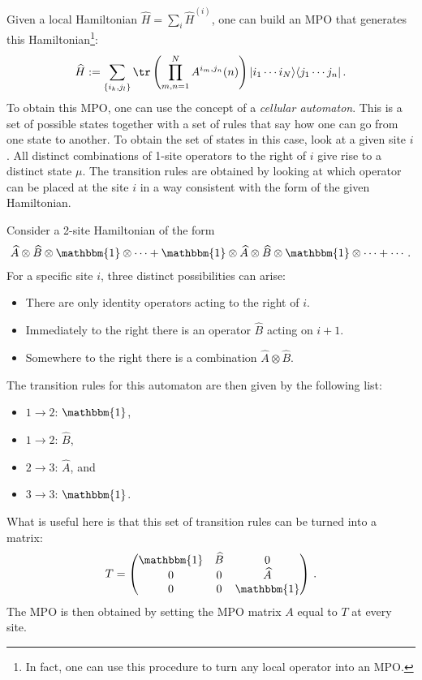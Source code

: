     \begin{method}
        Given a local Hamiltonian $\widehat{H}=\sum_i\widehat{H}^{(i)}$, one can build an MPO that generates this Hamiltonian\footnote{In fact, one can use this procedure to turn any local operator into an MPO.}:
        \begin{gather}
            \widehat{H} := \sum_{\{i_k,j_l\}}\tr\left(\prod_{m,n=1}^NA^{i_m,j_n}(n)\right)|i_1\cdots i_N\rangle\langle j_1\cdots j_n|\,.
        \end{gather}
        To obtain this MPO, one can use the concept of a \textit{cellular automaton}. This is a set of possible states together with a set of rules that say how one can go from one state to another. To obtain the set of states in this case, look at a given site $i$. All distinct combinations of 1-site operators to the right of $i$ give rise to a distinct state $\mu$. The transition rules are obtained by looking at which operator can be placed at the site $i$ in a way consistent with the form of the given Hamiltonian.
    \end{method}
    \begin{example}
        Consider a 2-site Hamiltonian of the form
        \begin{gather}
            \widehat{A}\otimes\widehat{B}\otimes\mathbbm{1}\otimes\cdots+\mathbbm{1}\otimes\widehat{A}\otimes\widehat{B}\otimes\mathbbm{1}\otimes\cdots+\cdots\,.
        \end{gather}
        For a specific site $i$, three distinct possibilities can arise:
        \begin{itemize}
            \item There are only identity operators acting to the right of $i$.
            \item Immediately to the right there is an operator $\widehat{B}$ acting on $i+1$.
            \item Somewhere to the right there is a combination $\widehat{A}\otimes\widehat{B}$.
        \end{itemize}
        The transition rules for this automaton are then given by the following list:
        \begin{itemize}
            \item $1\rightarrow2$: $\mathbbm{1}$,
            \item $1\rightarrow2$: $\widehat{B}$,
            \item $2\rightarrow3$: $\widehat{A}$, and
            \item $3\rightarrow3$: $\mathbbm{1}$.
        \end{itemize}
        What is useful here is that this set of transition rules can be turned into a matrix:
        \begin{gather}
            T=\begin{pmatrix}\mathbbm{1}&\widehat{B}&0\\0&0&\widehat{A}\\0&0&\mathbbm{1}\end{pmatrix}\,.
        \end{gather}
        The MPO is then obtained by setting the MPO matrix $A$ equal to $T$ at every site.
    \end{example}

